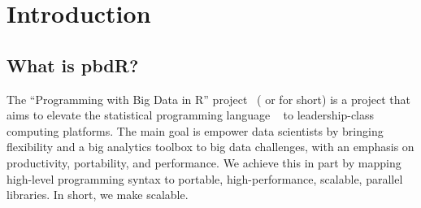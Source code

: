 \chapter[Introduction]{Introduction}
\label{sec:introduction}








\section{What is pbdR?}

The ``Programming with Big Data in R'' project~\citep{pbdR2012}
( or 
for short) is a project that aims to elevate the statistical programming
language ~\citep{Rcore} to leadership-class computing platforms.
The main goal is empower data scientists by bringing flexibility and a big
analytics toolbox to big data challenges, with an emphasis on productivity,
portability, and performance.  We achieve this in part by mapping high-level
programming syntax to portable, high-performance, scalable, parallel libraries.
In short, we make  scalable.

